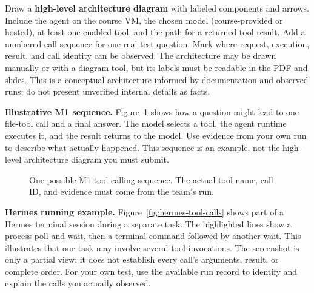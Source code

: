 \documentclass[11pt]{article}
\begin{document}
Draw a \textbf{high-level architecture diagram} with labeled components and arrows. Include the agent on the course VM, the chosen model (course-provided or hosted), at least one enabled tool, and the path for a returned tool result. Add a numbered call sequence for one real test question. Mark where request, execution, result, and call identity can be observed. The architecture may be drawn manually or with a diagram tool, but its labels must be readable in the PDF and slides. This is a conceptual architecture informed by documentation and observed runs; do not present unverified internal details as facts.

\noindent\textbf{Illustrative M1 sequence.} Figure~\ref{fig:midterm-example} shows how a question might lead to one file-tool call and a final answer. The model selects a tool, the agent runtime executes it, and the result returns to the model. Use evidence from your own run to describe what actually happened. This sequence is an example, not the high-level architecture diagram you must submit.

\begin{figure}[ht]
\centering
{}
\caption{One possible M1 tool-calling sequence. The actual tool name, call ID, and evidence must come from the team's run.}
\label{fig:midterm-example}
\end{figure}

\noindent\textbf{Hermes running example.} Figure~\ref{fig:hermes-tool-calls} shows part of a Hermes terminal session during a separate task. The highlighted lines show a process poll and wait, then a terminal command followed by another wait. This illustrates that one task may involve several tool invocations. The screenshot is only a partial view: it does not establish every call's arguments, result, or complete order. For your own test, use the available run record to identify and explain the calls you actually observed.
\end{document}
